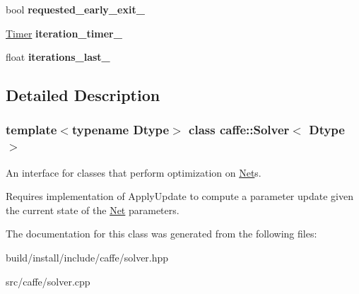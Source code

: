 \begin{DoxyCompactItemize}
\item 
\mbox{\label{classcaffe_1_1_solver_a5d9ea1f82685a4091290f45984cf9167}} 
bool {\bfseries requested\+\_\+early\+\_\+exit\+\_\+}
\item 
\mbox{\label{classcaffe_1_1_solver_aed311f5862c2c36472e599bfbf8cb4dd}} 
\mbox{\hyperlink{classcaffe_1_1_timer}{Timer}} {\bfseries iteration\+\_\+timer\+\_\+}
\item 
\mbox{\label{classcaffe_1_1_solver_a5d8886230702c45e94d2d427d0bb17fe}} 
float {\bfseries iterations\+\_\+last\+\_\+}
\end{DoxyCompactItemize}


\subsection{Detailed Description}
\subsubsection*{template$<$typename Dtype$>$\newline
class caffe\+::\+Solver$<$ Dtype $>$}

An interface for classes that perform optimization on \mbox{\hyperlink{classcaffe_1_1_net}{Net}}s. 

Requires implementation of Apply\+Update to compute a parameter update given the current state of the \mbox{\hyperlink{classcaffe_1_1_net}{Net}} parameters. 

The documentation for this class was generated from the following files\+:\begin{DoxyCompactItemize}
\item 
build/install/include/caffe/solver.\+hpp\item 
src/caffe/solver.\+cpp\end{DoxyCompactItemize}
